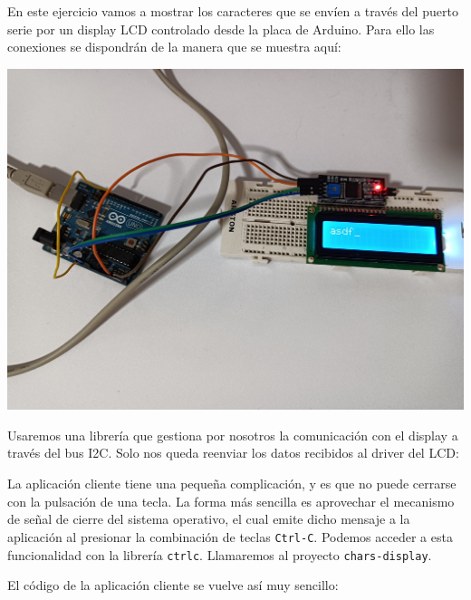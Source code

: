 En este ejercicio vamos a mostrar los caracteres que se envíen a través del
puerto serie por un display LCD controlado desde la placa de Arduino. Para ello
las conexiones se dispondrán de la manera que se muestra aquí:

\includegraphics[width=\linewidth]{chars-display-wiring.jpg}

Usaremos una librería que gestiona por nosotros la comunicación con el display
a través del bus I2C. Solo nos queda reenviar los datos recibidos al driver del
LCD:



La aplicación cliente tiene una pequeña complicación, y es que no puede
cerrarse con la pulsación de una tecla. La forma más sencilla es aprovechar
el mecanismo de señal de cierre del sistema operativo, el cual emite dicho
mensaje a la aplicación al presionar la combinación de teclas \verb|Ctrl-C|.
Podemos acceder a esta funcionalidad con la librería \verb|ctrlc|. Llamaremos
al proyecto \verb|chars-display|.



El código de la aplicación cliente se vuelve así muy sencillo:

